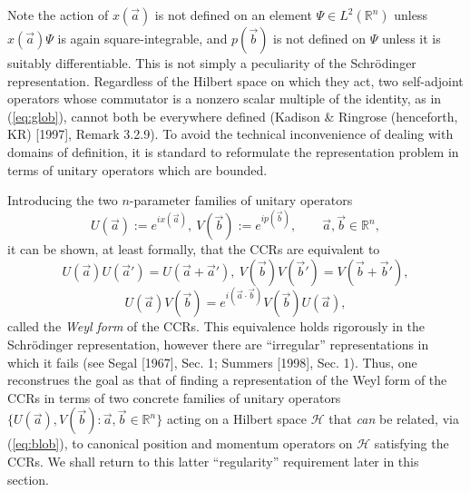 \documentclass[12pt]{article}
\theoremstyle{remark}
\theoremstyle{definition}
\newcommand{\hil}[1]{\mathcal{#1}}
\begin{document}
Note the action of $x(\vec{a})$ is not defined on an element $\Psi\in
L^{2}(\mathbb{R}^{n})$ unless $x(\vec{a}) \Psi$ is again
square-integrable, and $p(\vec{b})$ is not defined on $\Psi$ unless it
is suitably differentiable.  This is not simply a peculiarity of the
Schr\"{o}dinger representation.  Regardless of the Hilbert space on
which they act, two self-adjoint operators whose commutator is a
nonzero scalar multiple of the identity, as in (\ref{eq:glob}), cannot
both be everywhere defined (Kadison \& Ringrose (henceforth, KR)
[1997], Remark 3.2.9).  To avoid the technical inconvenience of
dealing with domains of definition, it is standard to reformulate the
representation problem in terms of unitary operators which are
bounded.
 
Introducing the two $n$-parameter families of unitary operators
\begin{equation} \label{eq:blob}
U(\vec{a}):=e^{ix(\vec{a})},\ V(\vec{b}):=e^{ip(\vec{b})},\qquad 
\vec{a},\vec{b}\in\mathbb{R}^{n},
\end{equation}
 it can be shown, at least formally, that the
  CCRs are equivalent to
 \begin{equation}\label{eq:wfCCR1}
 U(\vec{a})U(\vec{a}')=U(\vec{a}+\vec{a}'),\  V(\vec{b})V(\vec{b}')=V(\vec{b}
 +\vec{b}'), 
 \end{equation}
 \begin{equation}\label{eq:wfCCR2}
 U(\vec{a})V(\vec{b})=
 e^{i(\vec{a}\cdot\vec{b})}V(\vec{b})U(\vec{a}),
 \end{equation}
 called the \emph{Weyl form} of the CCRs.  This equivalence holds
 rigorously in the Schr\"{o}dinger representation, however there are
 ``irregular'' representations in which it fails (see Segal [1967],
 Sec. 1; Summers [1998], Sec. 1).  Thus, one reconstrues the goal as
 that of finding a representation of the Weyl form of the CCRs in
 terms of two concrete families of unitary operators
 $\{U(\vec{a}),V(\vec{b}): \vec{a},\vec{b}\in\mathbb{R}^{n}\}$ acting
 on a Hilbert space $\hil{H}$ that \emph{can} be related, via
 (\ref{eq:blob}), to canonical position and momentum operators on
 $\hil{H}$ satisfying the CCRs.  We shall return to this latter
 ``regularity'' requirement later in this section.
  
\end{document}
